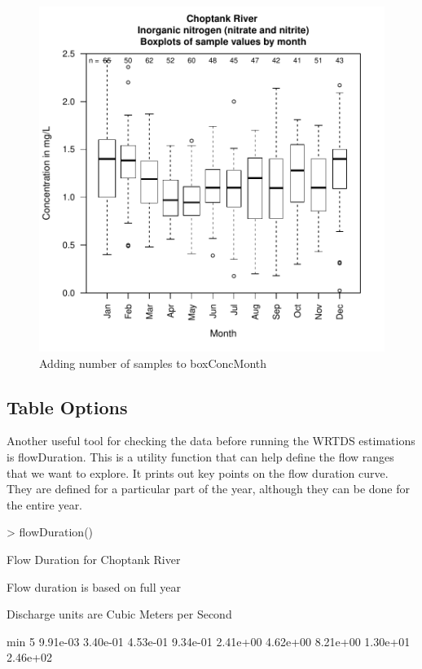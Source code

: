 \documentclass[a4paper,11pt]{article}
\begin{document}
\begin{figure}[ht]
\begin{center}

\includegraphics{EGRET-figBox2}
\end{center}
\caption{Adding number of samples to boxConcMonth}
\label{fig:box2}
\end{figure}

\subsection{Table Options}
\label{sec:tableOptionsWQ}
Another useful tool for checking the data before running the WRTDS estimations is flowDuration. This is a utility function that can help define the flow ranges that we want to explore.  It prints out key points on the flow duration curve.  They are defined for a particular part of the year, although they can be done for the entire year.  

\begin{Schunk}
\begin{Sinput}
> flowDuration()
\end{Sinput}
\begin{Soutput}
Flow Duration for Choptank River 

Flow duration is based on full year

Discharge units are Cubic Meters per Second

       min        5%
  9.91e-03  3.40e-01  4.53e-01  9.34e-01  2.41e+00  4.62e+00  8.21e+00  1.30e+01  2.46e+02 
\end{Soutput}
\end{Schunk}
\end{document}
